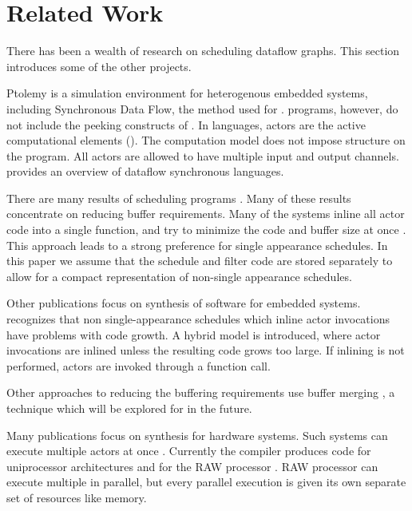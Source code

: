 \section{Related Work}
\label{chpt:related}

There has been a wealth of research on scheduling dataflow graphs.
This section introduces some of the other projects.

Ptolemy \cite{ptolemyoverview} is a simulation environment for
heterogenous embedded systems, including Synchronous Data Flow, the
method used for {\StreamIt}. {\SDF} programs, however, do not include
the peeking constructs of {\StreamIt}.  In {\SDF} languages, actors
are the active computational elements ({\filters}).  The {\SDF}
computation model does not impose structure on the program.  All
actors are allowed to have multiple input and output channels.
\cite{benveniste93dataflow} provides an overview of dataflow
synchronous languages.

There are many results of scheduling {\SDF} programs
\cite{leesdf}. Many of these results concentrate on reducing buffer
requirements. Many of the systems inline all actor code into a single
function, and try to minimize the code and buffer size at once
\cite{bhattacharyya99synthesis}.  This approach leads to a strong
preference for single appearance schedules.  In this paper we assume
that the schedule and filter code are stored separately to allow for a
compact representation of non-single appearance schedules.

Other publications focus on synthesis of software for embedded
systems. \cite{bhat1999x1} recognizes that non single-appearance
schedules which inline actor invocations have problems with code
growth.  A hybrid model is introduced, where actor invocations are
inlined unless the resulting code grows too large. If inlining is not
performed, actors are invoked through a function call.

Other approaches to reducing the buffering requirements use buffer
merging \cite{murthy99buffer}, a technique which will be explored for
{\StreamIt} in the future.

Many publications focus on synthesis for hardware systems.  Such
systems can execute multiple actors at once
\cite{govindarajan-minimizing}.  Currently the {\StreamIt} compiler
produces code for uniprocessor architectures \cite{thies02streamit}
and for the RAW processor \cite{gordo-thesis}.  RAW processor can
execute multiple {\filters} in parallel, but every parallel execution
is given its own separate set of resources like memory.

